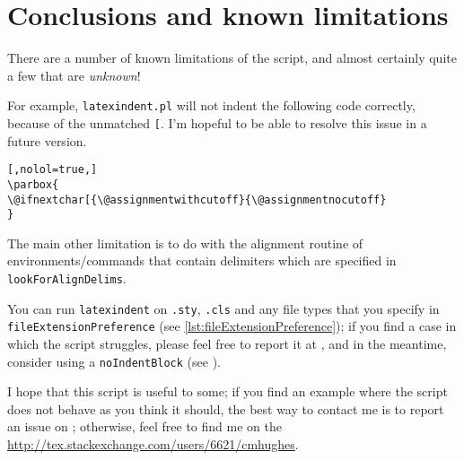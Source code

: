 \section{Conclusions and known limitations}\label{sec:knownlimitations}
 There are a number of known limitations of the script, and almost certainly quite a
 few that are \emph{unknown}!

 For example, \texttt{latexindent.pl} will not indent the following code correctly,
 because of the unmatched \lstinline![!. I'm hopeful to be able to resolve this
 issue in a future version.

 \begin{lstlisting}[,nolol=true,]
\parbox{
\@ifnextchar[{\@assignmentwithcutoff}{\@assignmentnocutoff}
}
\end{lstlisting}

 The main other limitation is to do with the alignment routine of environments/commands that contain
 delimiters which are specified in \texttt{lookForAlignDelims}.

 You can run \texttt{latexindent} on \texttt{.sty}, \texttt{.cls} and any file types
 that you specify in \lstinline[breaklines=true]!fileExtensionPreference! (see \vref{lst:fileExtensionPreference});
 if you find a case in which the script struggles, please feel free
 to report it at \cite{latexindent-home}, and
 in the meantime, consider using a \texttt{noIndentBlock} (see ).

 I hope that this script is useful to some; if you find an example where the
 script does not behave as you think it should, the best way to contact me is to
 report an issue on \cite{latexindent-home}; otherwise, feel free to find me on
 the \url{http://tex.stackexchange.com/users/6621/cmhughes}.
